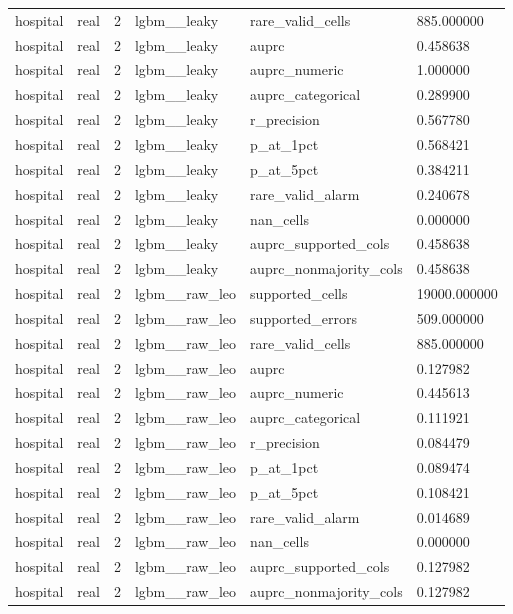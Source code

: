 \begin{tabular}{llllll}
hospital & real & 2 & lgbm\_\_leaky & rare\_valid\_cells & 885.000000 \\
hospital & real & 2 & lgbm\_\_leaky & auprc & 0.458638 \\
hospital & real & 2 & lgbm\_\_leaky & auprc\_numeric & 1.000000 \\
hospital & real & 2 & lgbm\_\_leaky & auprc\_categorical & 0.289900 \\
hospital & real & 2 & lgbm\_\_leaky & r\_precision & 0.567780 \\
hospital & real & 2 & lgbm\_\_leaky & p\_at\_1pct & 0.568421 \\
hospital & real & 2 & lgbm\_\_leaky & p\_at\_5pct & 0.384211 \\
hospital & real & 2 & lgbm\_\_leaky & rare\_valid\_alarm & 0.240678 \\
hospital & real & 2 & lgbm\_\_leaky & nan\_cells & 0.000000 \\
hospital & real & 2 & lgbm\_\_leaky & auprc\_supported\_cols & 0.458638 \\
hospital & real & 2 & lgbm\_\_leaky & auprc\_nonmajority\_cols & 0.458638 \\
hospital & real & 2 & lgbm\_\_raw\_leo & supported\_cells & 19000.000000 \\
hospital & real & 2 & lgbm\_\_raw\_leo & supported\_errors & 509.000000 \\
hospital & real & 2 & lgbm\_\_raw\_leo & rare\_valid\_cells & 885.000000 \\
hospital & real & 2 & lgbm\_\_raw\_leo & auprc & 0.127982 \\
hospital & real & 2 & lgbm\_\_raw\_leo & auprc\_numeric & 0.445613 \\
hospital & real & 2 & lgbm\_\_raw\_leo & auprc\_categorical & 0.111921 \\
hospital & real & 2 & lgbm\_\_raw\_leo & r\_precision & 0.084479 \\
hospital & real & 2 & lgbm\_\_raw\_leo & p\_at\_1pct & 0.089474 \\
hospital & real & 2 & lgbm\_\_raw\_leo & p\_at\_5pct & 0.108421 \\
hospital & real & 2 & lgbm\_\_raw\_leo & rare\_valid\_alarm & 0.014689 \\
hospital & real & 2 & lgbm\_\_raw\_leo & nan\_cells & 0.000000 \\
hospital & real & 2 & lgbm\_\_raw\_leo & auprc\_supported\_cols & 0.127982 \\
hospital & real & 2 & lgbm\_\_raw\_leo & auprc\_nonmajority\_cols & 0.127982 \\

\end{tabular}
